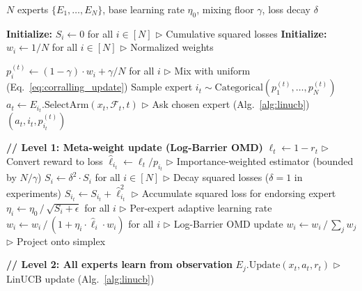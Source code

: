 \begin{algorithm}[h]
\caption{Corralling Meta-Learner (Log-Barrier OMD, Agarwal et al.\ 2017)}
\label{alg:corralling}
\begin{algorithmic}[1]

\REQUIRE $N$ experts $\{E_1, \ldots, E_N\}$, base learning rate $\eta_0$, mixing floor $\gamma$, loss decay $\delta$

\medskip
\STATE \textbf{Initialize:} $S_i \leftarrow 0$ for all $i \in [N]$ \hfill $\triangleright$ Cumulative squared losses
\STATE \textbf{Initialize:} $w_i \leftarrow 1/N$ for all $i \in [N]$ \hfill $\triangleright$ Normalized weights

\medskip
{}
    \STATE $p_i^{(t)} \leftarrow (1 - \gamma) \cdot w_i + \gamma / N$ for all $i$ \hfill $\triangleright$ Mix with uniform (Eq.~\ref{eq:corralling_update})
    \STATE Sample expert $i_t \sim \text{Categorical}(p_1^{(t)}, \ldots, p_N^{(t)})$
    \STATE $a_t \leftarrow E_{i_t}.\text{SelectArm}(x_t, \mathcal{F}_t, t)$ \hfill $\triangleright$ Ask chosen expert (Alg.~\ref{alg:linucb})
    \RETURN $(a_t, i_t, p_{i_t}^{(t)})$
\ENDFUNCTION

\medskip
{}
    \STATE \textbf{// Level 1: Meta-weight update (Log-Barrier OMD)}
    \STATE $\ell_t \leftarrow 1 - r_t$ \hfill $\triangleright$ Convert reward to loss
    \STATE $\hat{\ell}_{i_t} \leftarrow \ell_t / p_{i_t}$ \hfill $\triangleright$ Importance-weighted estimator (bounded by $N/\gamma$)
    \STATE $S_i \leftarrow \delta^2 \cdot S_i$ for all $i \in [N]$ \hfill $\triangleright$ Decay squared losses ($\delta = 1$ in experiments)
    \STATE $S_{i_t} \leftarrow S_{i_t} + \hat{\ell}_{i_t}^2$ \hfill $\triangleright$ Accumulate squared loss for endorsing expert
    \STATE $\eta_i \leftarrow \eta_0 \,/\, \sqrt{S_i + \epsilon}$ for all $i$ \hfill $\triangleright$ Per-expert adaptive learning rate
    \STATE $w_i \leftarrow w_i \,/\, (1 + \eta_i \cdot \hat{\ell}_i \cdot w_i)$ for all $i$ \hfill $\triangleright$ Log-Barrier OMD update
    \STATE $w_i \leftarrow w_i \,/\, \sum_j w_j$ \hfill $\triangleright$ Project onto simplex
    
    \medskip
    \STATE \textbf{// Level 2: All experts learn from observation}
        \STATE $E_j.\text{Update}(x_t, a_t, r_t)$ \hfill $\triangleright$ LinUCB update (Alg.~\ref{alg:linucb})
    \ENDFOR
\ENDFUNCTION

\end{algorithmic}
\end{algorithm}

